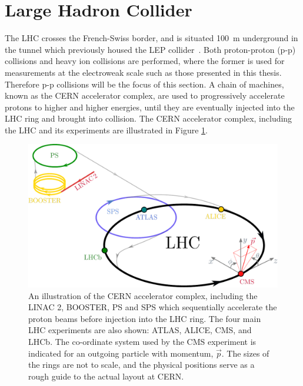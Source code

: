 
\section{Large Hadron Collider}\label{sec:lhc}
The LHC crosses the French-Swiss border, and is situated 100~m underground in the tunnel which previously housed the LEP collider~\cite{lep_design}. Both proton-proton (p-p) collisions and heavy ion collisions are performed, where the former is used for measurements at the electroweak scale such as those presented in this thesis. Therefore p-p collisions will be the focus of this section. A chain of machines, known as the CERN accelerator complex, are used to progressively accelerate protons to higher and higher energies, until they are eventually injected into the LHC ring and brought into collision. The CERN accelerator complex, including the LHC and its experiments are illustrated in Figure \ref{fig:cern_accelerator_complex}.

\begin{figure}[htb!]
  \centering
  \includegraphics[width=1\textwidth]{Figures/cms/lhc.pdf}
  \caption[The CERN accelerator complex]
  {
    An illustration of the CERN accelerator complex, including the LINAC 2, BOOSTER, PS and SPS which sequentially accelerate the proton beams before injection into the LHC ring. The four main LHC experiments are also shown: ATLAS, ALICE, CMS, and LHCb. The co-ordinate system used by the CMS experiment is indicated for an outgoing particle with momentum, $\vec{p}$. The sizes of the rings are not to scale, and the physical positions serve as a rough guide to the actual layout at CERN.
  }
  \label{fig:cern_accelerator_complex}
\end{figure}

